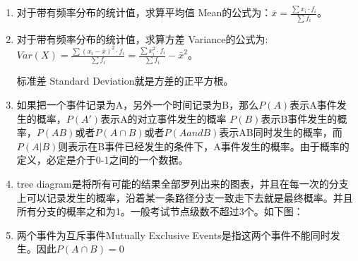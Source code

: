 \begin{enumerate}
\item 对于带有频率分布的统计值，求算\textcolor{r1}{平均值 Mean}的公式为：$\bar{x}=\frac{\sum x_i\cdot f_i}{\sum f_i}$。
\item 对于带有频率分布的统计值，求算\textcolor{r1}{方差 Variance}的公式为:\\
$Var(X)=\frac{\sum (x_i-\bar{x})^2\cdot f_i}{\sum f_i}=\frac{\sum x_i^2\cdot f_i}{\sum f_i}-\bar{x}^2$。

\textcolor{r1}{标准差 Standard Deviation}就是方差的正平方根。

\item 如果把一个事件记录为A，另外一个时间记录为B，那么$P(A)$表示A事件发生的概率，$P(A')$表示\textcolor{r1}{A的对立事件}发生的概率 $P(B)$表示B事件发生的概率，$P(AB)$或者$P(A\cap B)$或者$P(A and B)$表示AB同时发生的概率，而$P(A|B)$则表示在\textcolor{r1}{B事件已经发生}的条件下，A事件发生的概率。由于概率的定义，必定是介于0-1之间的一个数据。

\item tree diagram是将\textcolor{r1}{所有可能的结果}全部罗列出来的图表，并且在每一次的分支上可以记录发生的概率，沿着某一条路径分支一致走下去就是最终概率。并且所有分支的概率之和为1。一般考试节点级数不超过3个。如下图：\\
\begin{center}
\end{center}

\item 两个事件为\textcolor{r1}{互斥事件Mutually Exclusive Events}是指这两个事件不能同时发生。因此$P(A\cap B)=0$


\end{enumerate}
